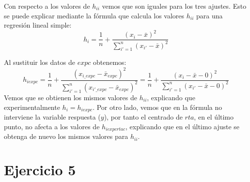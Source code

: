 \documentclass[a4paper]{article}
\begin{document}
Con respecto a los valores de $h_{ii}$ vemos que son iguales para los tres ajustes. Esto se puede explicar mediante la fórmula que calcula los valores $h_{ii}$ para una regresión lineal simple:
\[ h_i = \frac{1}{n} + \frac{(x_i - \bar{x})^2}{\sum_{i'=1}^n(x_{i'} - \bar{x})^2}       \]

Al sustituir los datos de $expc$ obtenemos: 
\[ h_{iexpc} = \frac{1}{n} + \frac{(x_{i\_expc} - \bar{x}_{expc})^2}{\sum_{i'=1}^n(x_{i'\_expc} - \bar{x}_{expc})^2} = \frac{1}{n} + \frac{(x_i - \bar{x} - 0)^2}{\sum_{i'=1}^n(x_{i'} - \bar{x} - 0)^2}        \]
Vemos que se obtienen los mismos valores de $h_{ii}$, explicando que experimentalmente $h_{i} = h_{iexpc}$. Por otro lado, vemos que en la fórmula no interviene la variable respuesta ($y$), por tanto el centrado de $rta$, en el último punto, no afecta a los valores de $h_{iexpcrtac}$, explicando que en el último ajuste se obtenga de nuevo los mismos valores para $h_{ii}$.

\section{Ejercicio 5}
\end{document}
